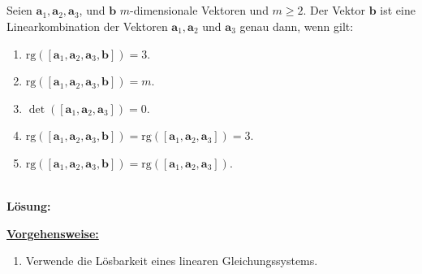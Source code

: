 \subsection*{}
Seien $ \textbf{a}_1, \textbf{a}_2 , \textbf{a}_3 $, und $ \textbf{b} $ $ m $-dimensionale Vektoren und $ m \geq 2 $.
Der Vektor $ \textbf{b} $ ist eine Linearkombination der Vektoren $  \textbf{a}_1, \textbf{a}_2  $ und $ \textbf{a}_3 $ genau dann, wenn gilt:
\renewcommand{\labelenumi}{(\alph{enumi})}
\begin{enumerate}
	\item 
	$ \mathrm{rg}\left([ \textbf{a}_1, \textbf{a}_2 , \textbf{a}_3 ,\textbf{b}] \right) = 3 $.
	\item
	$ \mathrm{rg}\left([ \textbf{a}_1, \textbf{a}_2 , \textbf{a}_3 ,\textbf{b}] \right) =m $.
	
	\item
	$ \det\left([ \textbf{a}_1, \textbf{a}_2 , \textbf{a}_3] \right) = 0 $.
	\item
	$ \mathrm{rg}\left([ \textbf{a}_1, \textbf{a}_2 , \textbf{a}_3 ,\textbf{b}] \right) = \mathrm{rg}\left([ \textbf{a}_1, \textbf{a}_2 , \textbf{a}_3]  \right) = 3 $.
	\item
	$ \mathrm{rg}\left([ \textbf{a}_1, \textbf{a}_2 , \textbf{a}_3 ,\textbf{b}] \right) = \mathrm{rg}\left([ \textbf{a}_1, \textbf{a}_2 , \textbf{a}_3] \right) $.
\end{enumerate}
\ \\
\textbf{Lösung:}
\begin{mdframed}
\underline{\textbf{Vorgehensweise:}}
\renewcommand{\labelenumi}{\theenumi.}
\begin{enumerate}
\item Verwende die Lösbarkeit eines linearen Gleichungssystems.
\end{enumerate}
\end{mdframed}

